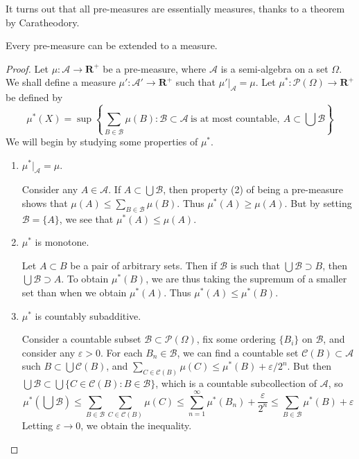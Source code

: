 It turns out that all pre-measures are essentially measures, thanks to a theorem by Caratheodory.

\begin{theorem}
    Every pre-measure can be extended to a measure.
\end{theorem}
\begin{proof}
    Let $\mu:\mathcal{A} \to \mathbf{R}^+$ be a pre-measure, where $\mathcal{A}$ is a semi-algebra on a set $\Omega$. We shall define a measure $\mu':\mathcal{A}' \to \mathbf{R}^+$ such that $\mu'|_{\mathcal{A}} = \mu$. Let $\mu^*:\mathcal{P}(\Omega) \to \mathbf{R}^+$ be defined by
    \[ \mu^*(X) = \sup \left\{ \sum_{B \in \mathcal{B}} \mu(B) : \mathcal{B} \subset \mathcal{A}\ \text{is at most countable},\ A \subset \bigcup \mathcal{B} \right\} \]
    We will begin by studying some properties of $\mu^*$.
    \begin{enumerate}
        \item $\mu^*|_{\mathcal{A}} = \mu$.
        \begin{proof*}
            Consider any $A \in \mathcal{A}$. If $A \subset \bigcup \mathcal{B}$, then property (2) of being a pre-measure shows that $\mu(A) \leq \sum_{B \in \mathcal{B}} \mu(B)$. Thus $\mu^*(A) \geq \mu(A)$. But by setting $\mathcal{B} = \{ A \}$, we see that $\mu^*(A) \leq \mu(A)$.
        \end{proof*}

        \item $\mu^*$ is monotone.
        \begin{proof*}
            Let $A \subset B$ be a pair of arbitrary sets. Then if $\mathcal{B}$ is such that $\bigcup \mathcal{B} \supset B$, then $\bigcup \mathcal{B} \supset A$. To obtain $\mu^*(B)$, we are thus taking the supremum of a smaller set than when we obtain $\mu^*(A)$. Thus $\mu^*(A) \leq \mu^*(B)$.
        \end{proof*}

        \item $\mu^*$ is countably subadditive.
        \begin{proof*}
            Consider a countable subset $\mathcal{B} \subset \mathcal{P}(\Omega)$, fix some ordering $\{ B_i \}$ on $\mathcal{B}$, and consider any $\varepsilon > 0$. For each $B_n \in \mathcal{B}$, we can find a countable set $\mathcal{C}(B) \subset \mathcal{A}$ such $B \subset \bigcup \mathcal{C}(B)$, and $\sum_{C \in \mathcal{C}(B)}\mu(C) \leq \mu^*(B) + \varepsilon/2^n$. But then $\bigcup \mathcal{B} \subset \bigcup \{ C \in \mathcal{C}(B) : B \in \mathcal{B} \}$, which is a countable subcollection of $\mathcal{A}$, so
            \[ \mu^*(\bigcup \mathcal{B}) \leq \sum_{B \in \mathcal{B}} \sum_{C \in \mathcal{C}(B)} \mu(C) \leq \sum_{n = 1}^\infty \mu^*(B_n) + \frac{\varepsilon}{2^n} \leq \sum_{B \in \mathcal{B}} \mu^*(B) + \varepsilon \]
            Letting $\varepsilon \to 0$, we obtain the inequality.
        \end{proof*}
    \end{enumerate}


\end{proof}
